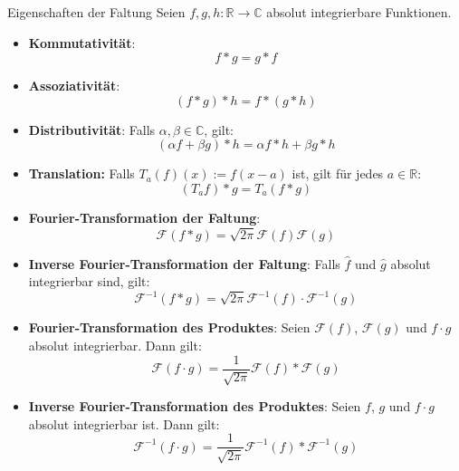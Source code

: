 \documentclass[a4paper,10pt]{article}
\begin{document}
\begin{mainbox}{Eigenschaften der Faltung}
  Seien \(f,g,h\colon\mathbb{R}\to\mathbb{C}\) absolut integrierbare Funktionen.
  \begin{itemize}
    \item{
      \textbf{Kommutativität}:
      \begin{equation*} f*g=g*f \end{equation*}
    }
    \item{
      \textbf{Assoziativität}:
      \begin{equation*} (f*g)*h=f*(g*h) \end{equation*}
    }
    \item{
      \textbf{Distributivität}: Falls \(\alpha,\beta\in\mathbb{C}\), gilt:
       \begin{equation*} (\alpha f+\beta g)*h=\alpha f*h+\beta g*h \end{equation*}
    }
    \item{
      \textbf{Translation:} Falls \(T_a(f)(x):=f(x-a)\) ist, gilt für jedes \(a\in\mathbb{R}\):
      \begin{equation*} (T_af)*g=T_a(f*g) \end{equation*}
    }
    \item{
      \textbf{Fourier-Transformation der Faltung}:
      \begin{equation*} \mathcal{F}(f*g)=\sqrt{2\pi}\mathcal{F}(f)\mathcal{F}(g) \end{equation*}
    }
    \item{
      \textbf{Inverse Fourier-Transformation der Faltung}: Falls \(\hat f\) und \(\hat g\) absolut integrierbar sind, gilt: \begin{equation*} \mathcal{F}^{-1}(f*g)={\sqrt{2\pi}}\mathcal{F}^{-1}(f)\cdot\mathcal{F}^{-1}(g) \end{equation*}
    }
    \item{
      \textbf{Fourier-Transformation des Produktes}: Seien \(\mathcal{F}(f)\), \(\mathcal{F}(g)\) und \(f\cdot g\) absolut integrierbar. Dann gilt:
       \begin{equation*} \mathcal{F}(f\cdot g)=\frac{1}{\sqrt{2\pi}}\mathcal{F}(f)*\mathcal{F}(g) \end{equation*}
    }
    \item{
      \textbf{Inverse Fourier-Transformation des Produktes}: Seien \(f\), \(g\) und \(f\cdot g\) absolut integrierbar ist. Dann gilt: \begin{equation*} \mathcal{F}^{-1}(f\cdot g)=\frac{1}{\sqrt{2\pi}}\mathcal{F}^{-1}(f)*\mathcal{F}^{-1}(g) \end{equation*}
    }
  \end{itemize}
\end{mainbox}
\end{document}
